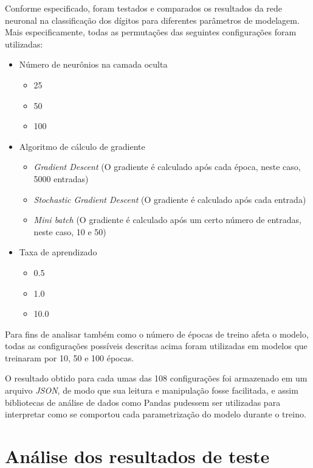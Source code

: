 \documentclass{article}
\begin{document}
Conforme especificado, foram testados e comparados os resultados da rede neuronal na classificação dos dígitos para diferentes parâmetros de modelagem. Mais especificamente, todas as permutações das seguintes configurações foram utilizadas:

\begin{itemize}
    \item Número de neurônios na camada oculta
        \begin{itemize}
            \item 25
            \item 50
            \item 100
        \end{itemize}
    \item Algoritmo de cálculo de gradiente 
        \begin{itemize}
            \item \textit{Gradient Descent} (O gradiente é calculado após cada época, neste caso, 5000 entradas)
            \item \textit{Stochastic Gradient Descent} (O gradiente é calculado após cada entrada)
            \item \textit{Mini batch} (O gradiente é calculado após um certo número de entradas, neste caso, 10 e 50)
        \end{itemize}
    \item Taxa de aprendizado 
        \begin{itemize}
            \item 0.5
            \item 1.0
            \item 10.0
        \end{itemize}
\end{itemize}

Para fins de analisar também como o número de épocas de treino afeta o modelo, todas as configurações possíveis descritas acima foram utilizadas em modelos que treinaram por 10, 50 e 100 épocas.

O resultado obtido para cada umas das 108 configurações foi armazenado em um arquivo \textit{JSON}, de modo que sua leitura e manipulação fosse facilitada, e assim bibliotecas de análise de dados como Pandas pudessem ser utilizadas para interpretar
como se comportou cada parametrização do modelo durante o treino.

\section{Análise dos resultados de teste}
\end{document}
